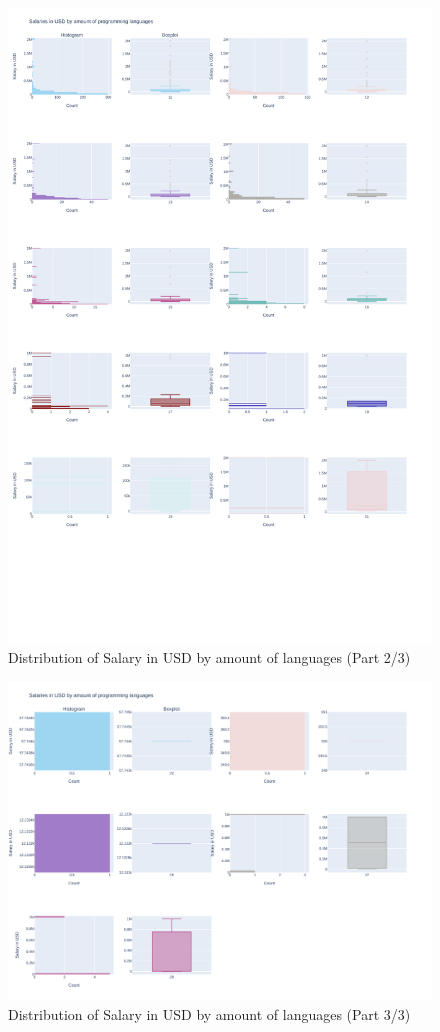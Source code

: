 \documentclass{article}
\begin{document}
\begin{figure}[ht]
    \centering
    \includegraphics[width=\textwidth]{images/salary_amount_2.pdf}
    \caption{Distribution of Salary in USD by amount of languages (Part 2/3)}
    \label{fig:salarybylang2}
\end{figure}
\begin{figure}[ht]
    \centering
    \includegraphics[width=\textwidth]{images/salary_amount_3.pdf}
    \caption{Distribution of Salary in USD by amount of languages (Part 3/3)}
    \label{fig:salarybylang3}
\end{figure}
\end{document}
